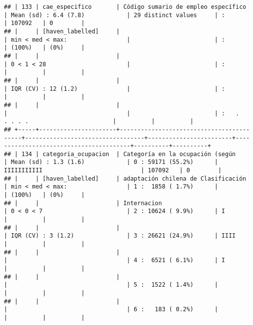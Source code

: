 \documentclass[]{article}
\begin{document}
\begin{verbatim}
## | 133 | cae_especifico       | Código sumario de empleo específico      | Mean (sd) : 6.4 (7.8)            | 29 distinct values     | :                                      | 107092   | 0        |
## |     | [haven_labelled]     |                                          | min < med < max:                 |                        | :                                      | (100%)   | (0%)     |
## |     |                      |                                          | 0 < 1 < 28                       |                        | :                                      |          |          |
## |     |                      |                                          | IQR (CV) : 12 (1.2)              |                        | :                                      |          |          |
## |     |                      |                                          |                                  |                        | :   .   . . . .                        |          |          |
## +-----+----------------------+------------------------------------------+----------------------------------+------------------------+----------------------------------------+----------+----------+
## | 134 | categoria_ocupacion  | Categoría en la ocupación (según         | Mean (sd) : 1.3 (1.6)            | 0 : 59171 (55.2%)      | IIIIIIIIIII                            | 107092   | 0        |
## |     | [haven_labelled]     | adaptación chilena de Clasificación      | min < med < max:                 | 1 :  1858 ( 1.7%)      |                                        | (100%)   | (0%)     |
## |     |                      | Internacion                              | 0 < 0 < 7                        | 2 : 10624 ( 9.9%)      | I                                      |          |          |
## |     |                      |                                          | IQR (CV) : 3 (1.2)               | 3 : 26621 (24.9%)      | IIII                                   |          |          |
## |     |                      |                                          |                                  | 4 :  6521 ( 6.1%)      | I                                      |          |          |
## |     |                      |                                          |                                  | 5 :  1522 ( 1.4%)      |                                        |          |          |
## |     |                      |                                          |                                  | 6 :   183 ( 0.2%)      |                                        |          |          |

\end{verbatim}
\end{document}
